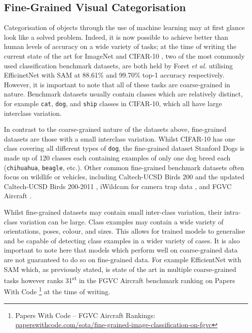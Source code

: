 \subsection{Fine-Grained Visual Categorisation}\label{ch:Background,sec:Fine-grainedCV}

Categorisation of objects through the use of machine learning may at first glance look like a solved problem. Indeed, it is now possible to achieve better than human levels of accuracy on a wide variety of tasks; at the time of writing the current state of the art for ImageNet \cite{deng_imagenet:_2009} and CIFAR-10 \cite{krizhevsky_learning_2009}, two of the most commonly used classification benchmark datasets, are both held by Foret \textit{et al.} utilising EfficinetNet with SAM \cite{foret_sharpness-aware_2020} at 88.61\% and 99.70\% top-1 accuracy respectively. However, it is important to note that all of these tasks are coarse-grained in nature. Benchmark datasets usually contain classes which are relatively distinct, for example \texttt{cat}, \texttt{dog}, and \texttt{ship} classes in CIFAR-10, which all have large interclass variation. 

In contrast to the coarse-grained nature of the datasets above, fine-grained datasets are those with a small interclass variation. Whilst CIFAR-10 has one class covering all different types of \texttt{dog}, the fine-grained dataset Stanford Dogs \cite{khosla_novel_2011} is made up of 120 classes each containing examples of only one dog breed each (\texttt{chihuahua}, \texttt{beagle}, etc.). Other common fine-grained benchmark datasets often focus on wildlife or vehicles, including Caltech-UCSD Birds 200 \cite{welinder_caltech-ucsd_2010} and the updated Caltech-UCSD Birds 200-2011 \cite{wah_caltech-ucsd_2011}, iWildcam for camera trap data \cite{beery_iwildcam_2019}, and FGVC Aircraft \cite{maji_fine-grained_2013}. 

Whilst fine-grained datasets may contain small inter-class variation, their intra-class variation can be large. Class examples may contain a wide variety of orientations, poses, colour, and sizes. This allows for trained models to generalise and be capable of detecting class examples in a wider variety of cases. It is also important to note here that models which perform well on coarse-grained data are not guaranteed to do so on fine-grained data. For example EfficientNet with SAM which, as previously stated, is state of the art in multiple coarse-grained tasks however ranks 31\textsuperscript{st} in the FGVC Aircraft benchmark ranking on Papers With Code \footnote{Papers With Code -- FGVC Aircraft Rankings: \href{https://paperswithcode.com/sota/fine-grained-image-classification-on-fgvc}{paperswithcode.com/sota/fine-grained-image-classification-on-fgvc}} at the time of writing.

